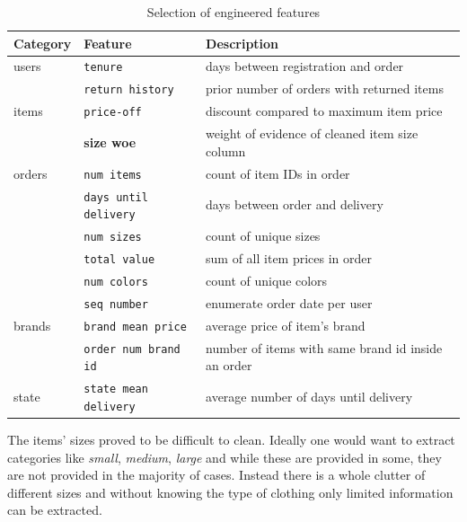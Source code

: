 \begin{table}
\centering
\caption{Selection of engineered features}
\tiny
\label{features-tab}
\begin{tabular}{@{}lll@{}}
\toprule
Category       & Feature             & Description                           \\ \midrule
users  & \texttt{tenure}              & days between registration and order        \\
       & \texttt{return history}      & prior number of orders with returned items \\
items  & \texttt{price-off}           & discount compared to maximum item price    \\
       & \textbf{size woe}            & weight of evidence of cleaned item size column\\
orders & \texttt{num items}           & count of item IDs in order                 \\
       & \texttt{days until delivery} & days between order and delivery            \\
       & \texttt{num sizes}           & count of unique sizes                      \\
       & \texttt{total value}         & sum of all item prices in order            \\
       & \texttt{num colors}          & count of unique colors                     \\
       & \texttt{seq number}          & enumerate order date per user              \\
brands & \texttt{brand mean price}    & average price of item's brand              \\
       & \texttt{order num brand id}  & number of items with same brand id inside an order \\
state  & \texttt{state mean delivery} & average number of days until delivery \\
\bottomrule
\end{tabular}
\end{table}

The items' sizes proved to be difficult to clean. Ideally one would want to extract categories like \textit{small}, \textit{medium}, \textit{large} and while these are provided in some, they are not provided in the majority of cases. Instead there is a whole clutter of different sizes and without knowing the type of clothing only limited information can be extracted.



